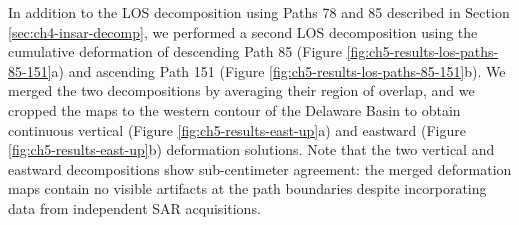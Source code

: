 In addition to the LOS decomposition using Paths 78 and 85 described in Section \ref{sec:ch4-insar-decomp}, we performed a second LOS decomposition using the cumulative deformation of descending Path 85 (Figure \ref{fig:ch5-results-los-paths-85-151}a) and ascending Path 151 (Figure \ref{fig:ch5-results-los-paths-85-151}b).
We merged the two decompositions by averaging their region of overlap, and we cropped the maps to the western contour of the Delaware Basin to obtain continuous vertical (Figure \ref{fig:ch5-results-east-up}a) and eastward (Figure \ref{fig:ch5-results-east-up}b) deformation solutions.
Note that the two vertical and eastward decompositions show sub-centimeter agreement: the merged deformation maps contain no visible artifacts at the path boundaries despite incorporating data from independent SAR acquisitions.


